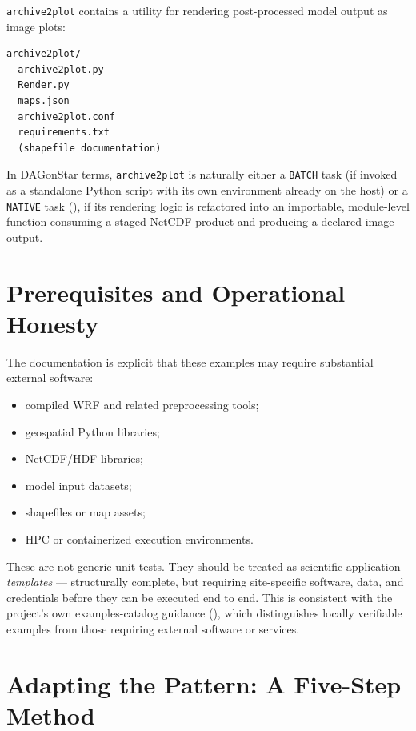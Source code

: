 \texttt{archive2plot} contains a utility for rendering post-processed model
output as image plots:

\begin{lstlisting}[style=bash]
archive2plot/
  archive2plot.py
  Render.py
  maps.json
  archive2plot.conf
  requirements.txt
  (shapefile documentation)
\end{lstlisting}

In DAGonStar terms, \texttt{archive2plot} is naturally either a
\texttt{BATCH} task (if invoked as a standalone Python script with its own
environment already on the host) or a \texttt{NATIVE} task
(), if its rendering logic is refactored into an
importable, module-level function consuming a staged NetCDF product and
producing a declared image output.

\section{Prerequisites and Operational Honesty}

The documentation is explicit that these examples may require substantial
external software:

\begin{itemize}[leftmargin=1.4em]
  \item compiled WRF and related preprocessing tools;
  \item geospatial Python libraries;
  \item NetCDF/HDF libraries;
  \item model input datasets;
  \item shapefiles or map assets;
  \item HPC or containerized execution environments.
\end{itemize}

\begin{cautionbox}
These are not generic unit tests. They should be treated as scientific
application \emph{templates} --- structurally complete, but requiring
site-specific software, data, and credentials before they can be executed
end to end. This is consistent with the project's own examples-catalog
guidance (), which distinguishes locally verifiable
examples from those requiring external software or services.
\end{cautionbox}

\section{Adapting the Pattern: A Five-Step Method}

